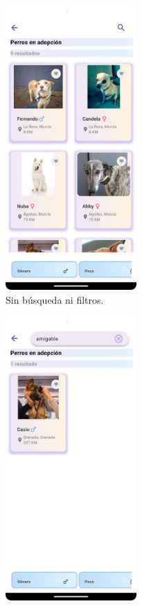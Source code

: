 \documentclass[a4paper, 12pt]{article}
\begin{document}
\begin{figure}[H]
   	\begin{subfigure}{0.48\textwidth}
		\begin{center}
			{\includegraphics[width=5cm]{app/DogList.png}\par}
			\caption{Sin búsqueda ni filtros.}
		\end{center}  
	\end{subfigure}\hfill
   	\begin{subfigure}{0.48\textwidth}
		\begin{center}
			{\includegraphics[width=5cm]{app/DogListSearch.png}\par}

\end{center}
\end{subfigure}
\end{figure}
\end{document}
